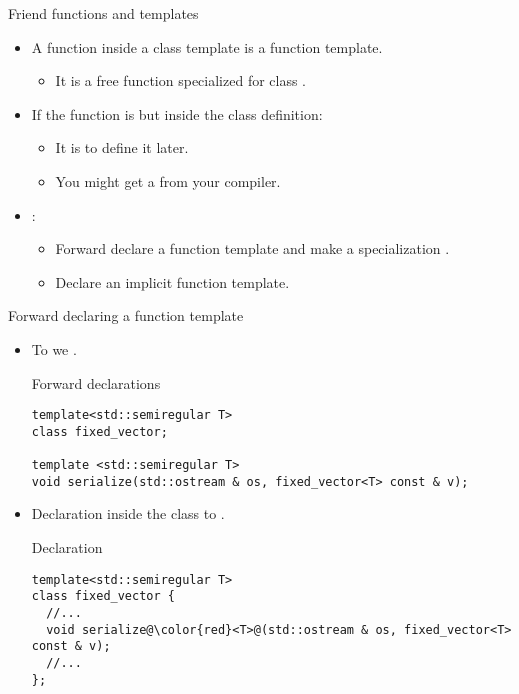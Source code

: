 \begin{frame}[t,fragile]{Friend functions and templates}
\begin{itemize}
  \item A  function inside a class template is 
        a function template.
    \begin{itemize}
      \item It is a free function specialized for class .
    \end{itemize}

  \item If the function is  but 
        inside the class definition:
    \begin{itemize}
      \item It is  to define it later.
      \item You might get a  from your compiler.
    \end{itemize}

  \item {}:
    \begin{itemize}
      \item Forward declare a function template and make a specialization .
      \item Declare an implicit  function template.
    \end{itemize}
\end{itemize}
\end{frame}

\begin{frame}[t,fragile,shrink=15]{Forward declaring a function template}
\begin{itemize}
  \item To  
        we  .

\begin{block}{Forward declarations}
\begin{lstlisting}
template<std::semiregular T>
class fixed_vector;

template <std::semiregular T>
void serialize(std::ostream & os, fixed_vector<T> const & v);
\end{lstlisting}
\end{block}

  \item Declaration inside the class  to .
\begin{block}{Declaration}
\begin{lstlisting}[escapechar=@]
template<std::semiregular T>
class fixed_vector {
  //...
  void serialize@\color{red}<T>@(std::ostream & os, fixed_vector<T> const & v);
  //...
};
\end{lstlisting}
\end{block}

\end{itemize}
\end{frame}

